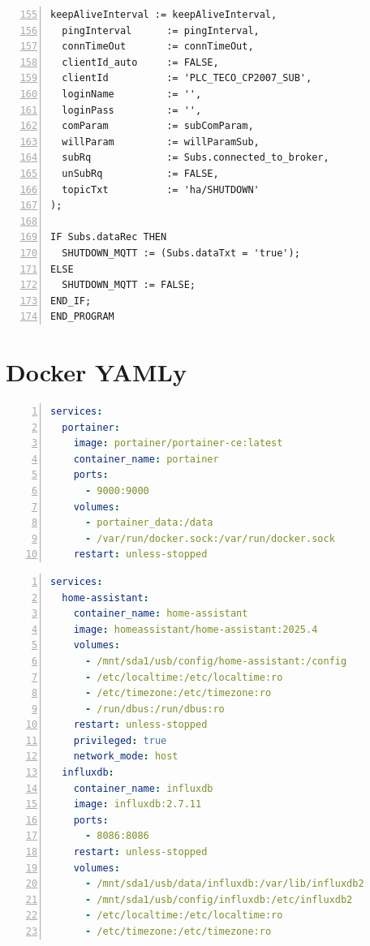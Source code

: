 \pagebreak
\begin{lstlisting}[language=ST, breaklines=true, numbers=left, firstnumber=155, numberstyle=\small, numbersep=10pt, frame=single, basicstyle=\ttfamily\small]
  keepAliveInterval := keepAliveInterval,
  pingInterval      := pingInterval,
  connTimeOut       := connTimeOut,
  clientId_auto     := FALSE,
  clientId          := 'PLC_TECO_CP2007_SUB',
  loginName         := '',
  loginPass         := '',
  comParam          := subComParam,
  willParam         := willParamSub,
  subRq             := Subs.connected_to_broker,
  unSubRq           := FALSE,
  topicTxt          := 'ha/SHUTDOWN'
);

IF Subs.dataRec THEN
  SHUTDOWN_MQTT := (Subs.dataTxt = 'true');
ELSE
  SHUTDOWN_MQTT := FALSE;
END_IF;
END_PROGRAM
\end{lstlisting}
\chapter{Docker YAMLy}
\label{apend:dockeryaml}
\begin{lstlisting}[language=YAML, breaklines=true, numbers=left, numberstyle=\small, numbersep=10pt, frame=single, basicstyle=\ttfamily\small, caption={Portainer YAML}, label={lst:portaineryaml}]
services:
  portainer:
    image: portainer/portainer-ce:latest
    container_name: portainer
    ports:
      - 9000:9000
    volumes:
      - portainer_data:/data
      - /var/run/docker.sock:/var/run/docker.sock
    restart: unless-stopped
\end{lstlisting}
\begin{lstlisting}[language=YAML, breaklines=true, numbers=left, numberstyle=\small, numbersep=10pt, frame=single, basicstyle=\ttfamily\small, caption={Stack YAML}, label={lst:stackyaml}]
services:
  home-assistant:
    container_name: home-assistant
    image: homeassistant/home-assistant:2025.4
    volumes:
      - /mnt/sda1/usb/config/home-assistant:/config
      - /etc/localtime:/etc/localtime:ro
      - /etc/timezone:/etc/timezone:ro
      - /run/dbus:/run/dbus:ro
    restart: unless-stopped
    privileged: true
    network_mode: host
  influxdb:
    container_name: influxdb
    image: influxdb:2.7.11
    ports:
      - 8086:8086
    restart: unless-stopped
    volumes:
      - /mnt/sda1/usb/data/influxdb:/var/lib/influxdb2
      - /mnt/sda1/usb/config/influxdb:/etc/influxdb2
      - /etc/localtime:/etc/localtime:ro
      - /etc/timezone:/etc/timezone:ro
\end{lstlisting}
\pagebreak

